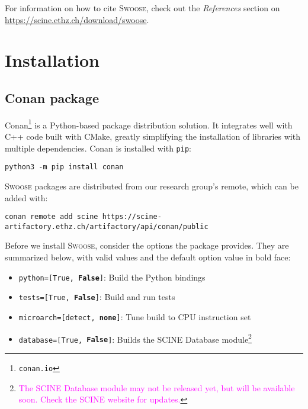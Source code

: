 \documentclass[]{tufte-book}
\begin{document}
For information on how to cite \textsc{Swoose}, check out the \textit{References} section on \href{https://scine.ethz.ch/download/swoose}{https://scine.ethz.ch/download/swoose}.

\enlargethispage{\baselineskip}

\chapter{Installation}\label{ch:installation}

\section{Conan package}
Conan\footnote{\texttt{conan.io}} is a Python-based package distribution
solution. It integrates well with C++ code built with CMake, greatly simplifying
the installation of libraries with multiple dependencies. Conan is installed
with \texttt{pip}:

\begin{mdframed}[backgroundcolor=LightSteelBlue!25, linewidth=0pt]
\begin{verbatim}
python3 -m pip install conan
\end{verbatim}
\end{mdframed}

\textsc{Swoose} packages are distributed from our research group's remote,
which can be added with:

\begin{mdframed}[backgroundcolor=LightSteelBlue!25, userdefinedwidth=16.1cm, linewidth=0pt]
\begin{verbatim}
conan remote add scine https://scine-artifactory.ethz.ch/artifactory/api/conan/public
\end{verbatim}
\end{mdframed}

Before we install \textsc{Swoose}, consider the options the package
provides. They are summarized below, with valid values and the default option
value in bold face:

\begin{itemize}
  \item \texttt{python=[True, \textbf{False}]}: Build the Python bindings
  \item \texttt{tests=[True, \textbf{False}]}: Build and run tests
  \item \texttt{microarch=[detect, \textbf{none}]}: Tune build to CPU
    instruction set
  \item \texttt{database=[True, \textbf{False}]}: Builds the SCINE Database module\footnote{\textcolor{magenta}{The SCINE Database module may not be released yet, but will be available soon. Check the SCINE website for updates.}}
\end{itemize}
\end{document}
